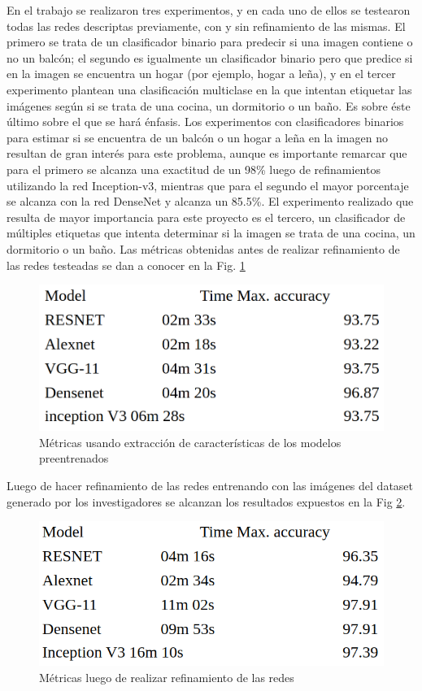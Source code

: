 En el trabajo se realizaron tres experimentos, y en cada uno de ellos se testearon todas las redes descriptas previamente, con y sin refinamiento de las mismas. El primero se trata de un clasificador binario para predecir si una imagen contiene o no un balcón; el segundo es igualmente un clasificador binario pero que predice si en la imagen se encuentra un hogar (por ejemplo, hogar a leña), y en el tercer experimento plantean una clasificación multiclase en la que intentan etiquetar las imágenes según si se trata de una cocina, un dormitorio o un baño. Es sobre éste último sobre el que se hará énfasis. 
Los experimentos con clasificadores binarios para estimar si se encuentra de un balcón o un hogar a leña en la imagen no resultan de gran interés para este problema, aunque es importante remarcar que para el primero se alcanza una exactitud de un 98\% luego de refinamientos utilizando la red Inception-v3, mientras que para el segundo el mayor porcentaje se alcanza con la red DenseNet y alcanza un 85.5\%. 
El experimento realizado que resulta de mayor importancia para este proyecto es el tercero, un clasificador de múltiples etiquetas que intenta determinar si la imagen se trata de una cocina, un dormitorio o un baño. Las métricas obtenidas antes de realizar refinamiento de las redes testeadas se dan a conocer en la Fig. \ref{fig:metricstransferlearning}
\begin{figure}[h!]
	\centering
	\includegraphics[width=0.6\linewidth]{images/metrics_transfer_learning}
	\caption[metrics_transfer_learning]{Métricas usando extracción de características de los modelos preentrenados}
	\label{fig:metricstransferlearning}
\end{figure}
Luego de hacer refinamiento de las redes entrenando con las imágenes del dataset generado por los investigadores se alcanzan los resultados expuestos en la Fig \ref{fig:metricstransferlearningfinetunned}.

\begin{figure}[h!]
	\centering
	\includegraphics[width=0.7\linewidth]{images/metrics_transfer_learning_fine_tunned}
	\caption[metricstransferlearningfinetunned]{Métricas luego de realizar refinamiento de las redes}
	\label{fig:metricstransferlearningfinetunned}
\end{figure}

